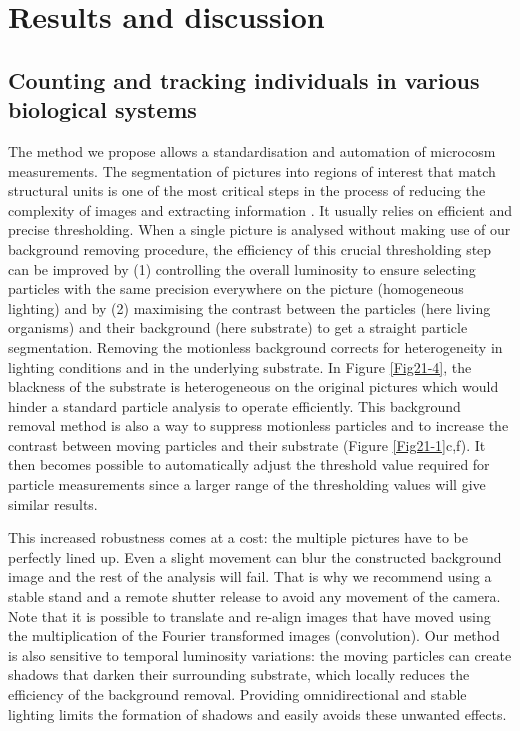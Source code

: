 \section{Results and discussion}

\subsection{Counting and tracking individuals in various biological systems}

The method we propose allows a standardisation and automation of microcosm
measurements. The segmentation of pictures into regions of interest that match
structural units is one of the most critical steps in the process of reducing
the complexity of images and extracting information \autocite{russ2002a}. It
usually relies on efficient and precise thresholding. When a single picture is analysed without
making use of our background removing procedure, the efficiency of this crucial
thresholding step can be improved by (1) controlling the overall luminosity to
ensure selecting particles with the same precision everywhere on the picture
(homogeneous lighting) and by (2) maximising the contrast between the particles
(here living organisms) and their background (here substrate) to get a straight
particle segmentation. Removing the motionless background corrects for
heterogeneity in lighting conditions and in the underlying substrate. In Figure
\ref{Fig21-4}, the blackness of the substrate is heterogeneous on the original
pictures which would hinder a standard particle analysis to operate efficiently. This
background removal method is also a way to suppress motionless particles and to
increase the contrast between moving particles and their substrate (Figure
\ref{Fig21-1}c,f). It then becomes possible to automatically adjust the
threshold value required for particle measurements since a larger range of the thresholding values will give similar results.

This increased robustness comes at a cost: the multiple pictures have to be
perfectly lined up. Even a slight movement can blur the constructed background
image and the rest of the analysis will fail. That is why we recommend using a
stable stand and a remote shutter release to avoid any movement of the camera.
Note that it is possible to translate and re-align images that have moved using
the multiplication of the Fourier transformed images (convolution). Our method
is also sensitive to temporal luminosity variations: the moving particles can
create shadows that darken their surrounding substrate, which locally reduces
the efficiency of the background removal. Providing omnidirectional and stable
lighting limits the formation of shadows and easily avoids these unwanted
effects.

